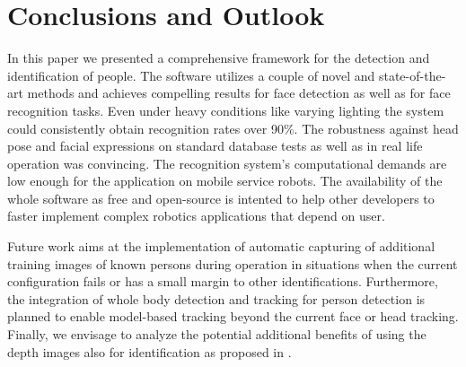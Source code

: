 
\section{Conclusions and Outlook}
\label{sec:conclusions}
In this paper we presented a comprehensive framework for the detection and identification of people. The software utilizes a couple of novel and state-of-the-art methods and achieves compelling results for face detection as well as for face recognition tasks. Even under heavy conditions like varying lighting the system could consistently obtain recognition rates over 90\%. The robustness against head pose and facial expressions on standard database tests as well as in real life operation was convincing. The recognition system's computational demands are low enough for the application on mobile service robots. The availability of the whole software as free and open-source is intented to help other developers to faster implement complex robotics applications that depend on user.


Future work aims at the implementation of automatic capturing of additional training images of known persons during operation in situations when the current configuration fails or has a small margin to other identifications. Furthermore, the integration of whole body detection and tracking for person detection is planned to enable model-based tracking beyond the current face or head tracking. Finally, we envisage to analyze the potential additional benefits of using the depth images also for identification as proposed in \cite{Tsalakanidou03}.
